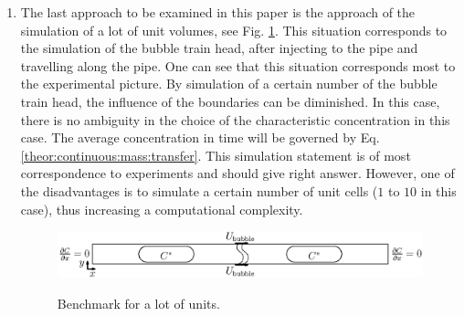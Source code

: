\documentclass{article}
\begin{document}
\begin{enumerate}
\item 
The last approach to be examined in this paper is the approach of the simulation of a lot of unit
volumes, see Fig. \ref{fig:benchmark:alot}. This situation corresponds to the simulation of the
bubble train head, after injecting to the pipe and travelling along the pipe. One can see that this
situation corresponds most to the experimental picture. By simulation of a certain number of the
bubble train head, the influence of the boundaries can be
diminished. In this case, there is no ambiguity in the choice of the
characteristic concentration in this case. The average concentration in time will be governed
by Eq.
\ref{theor:continuous:mass:transfer}. This simulation statement is of most correspondence to
experiments and should give right answer. However, one of the
disadvantages is to simulate a certain number of unit cells ($1$ to $10$ in this case), thus
increasing a computational
complexity.
\begin{figure}[htb!]
\includegraphics[width=\textwidth]{Figures/benchmark_alot.eps}\\
\caption{Benchmark for a lot of units. \label{fig:benchmark:alot}}
\end{figure}
\end{enumerate} 
\end{document}
